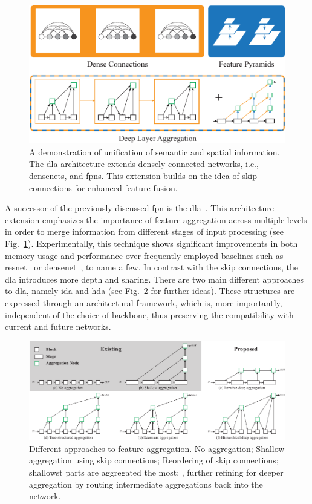 \begin{figure}[t]
    \centerline{\includegraphics[width=0.7\linewidth]{figures/theoretical_foundations/dla_comparison.pdf}}
    \caption[\Gls{dla} comparison]{A demonstration of unification of semantic and spatial information. The \gls{dla} architecture extends densely connected networks, i.e., \glspl{densenet}, and \glspl{fpn}. This extension builds on the idea of skip connections for enhanced feature fusion. }
    \label{fig:DLAMotivation}
\end{figure}

A successor of the previously discussed \gls{fpn} is the \gls{dla}~\cite{yu2019dla}. This architecture extension emphasizes the importance of feature aggregation across multiple levels in order to merge information from different stages of input processing (see Fig.~\ref{fig:DLAMotivation}). Experimentally, this technique shows significant improvements in both memory usage and performance over frequently employed baselines such as \gls{resnet}~\cite{he2015resnet} or \gls{densenet}~\cite{huang2018densenet}, to name a few. In contrast with the skip connections, the \gls{dla} introduces more depth and sharing. There are two main different approaches to \gls{dla}, namely \gls{ida} and \gls{hda} (see Fig.~\ref{fig:DLADiffApproaches} for further ideas). These structures are expressed through an architectural framework, which is, more importantly, independent of the choice of backbone, thus preserving the compatibility with current and future networks.

\begin{figure}[t]
    \centerline{\includegraphics[width=0.8\linewidth]{figures/theoretical_foundations/dla_existing_vs_proposed.pdf}}
    \caption[\Gls{dla} proposed solution]{Different approaches to feature aggregation.  No aggregation;  Shallow aggregation using skip connections;  Reordering of skip connections;  shallowst parts are aggregated the most; ,  further refining for deeper aggregation by routing intermediate aggregations back into the network. }
    \label{fig:DLADiffApproaches}
\end{figure}

